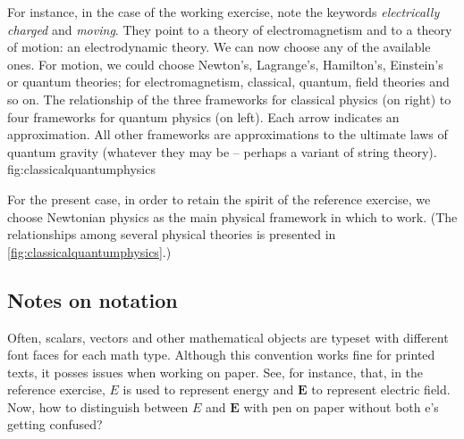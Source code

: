 For instance, in the case of the working exercise, note the keywords \emph{electrically charged} and \emph{moving}. They point to a theory of electromagnetism and to a theory of motion: an electrodynamic theory. We can now choose any of the available ones. For motion, we could choose Newton's, Lagrange's, Hamilton's, Einstein's or quantum theories; for electromagnetism, classical, quantum, field theories and so on.
%
%
{The relationship of the three frameworks for classical physics (on right) to four frameworks for quantum physics (on left).         Each arrow indicates an approximation. All other frameworks are approximations to the ultimate laws of quantum gravity (whatever   they may be -- perhaps a variant of string theory). \cite[chap. 1, p. iv]{thorne:2013}}
{fig:classicalquantumphysics}
%
%
%
%
%
%

For the present case, in order to retain the spirit of the reference exercise, we choose Newtonian physics as the main physical framework in which to work. (The relationships among several physical theories is presented in \cref{fig:classicalquantumphysics}.)


\subsection{Notes on notation}
%
%
Often, scalars, vectors and other mathematical objects are typeset with different font faces for each math type. Although this convention works fine for printed texts, it posses issues when working on paper. See, for instance, that, in the reference exercise, $E$ is used to represent energy and $\mathbf{E}$ to represent electric field. Now, how to distinguish between $E$ and $\mathbf{E}$ with pen on paper without both e's getting confused?

